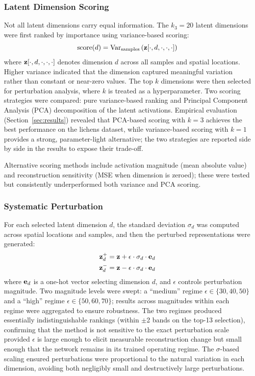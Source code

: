 \subsubsection{Latent Dimension Scoring}
Not all latent dimensions carry equal information.
The $k_3 = 20$ latent dimensions were first ranked by importance using variance-based scoring:
\begin{equation}
\text{score}(d) = \text{Var}_{\text{samples}}\left(\mathbf{z}[\cdot, d, \cdot, \cdot, \cdot]\right)
\label{eq:dim_score}
\end{equation}
where $\mathbf{z}[\cdot, d, \cdot, \cdot, \cdot]$ denotes dimension $d$ across all samples and spatial locations.
Higher variance indicated that the dimension captured meaningful variation rather than constant or near-zero values.
The top $k$ dimensions were then selected for perturbation analysis, where $k$ is treated as a hyperparameter.
Two scoring strategies were compared: pure variance-based ranking and Principal Component Analysis (PCA) decomposition of the latent activations.
Empirical evaluation (Section~\ref{sec:results}) revealed that PCA-based scoring with $k=3$ achieves the best performance on the lichens dataset, while variance-based scoring with $k=1$ provides a strong, parameter-light alternative; the two strategies are reported side by side in the results to expose their trade-off.

Alternative scoring methods include activation magnitude (mean absolute value) and reconstruction sensitivity (MSE when dimension is zeroed); these were tested but consistently underperformed both variance and PCA scoring.

\subsubsection{Systematic Perturbation}
For each selected latent dimension $d$, the standard deviation $\sigma_d$ was computed across spatial locations and samples, and then the perturbed representations were generated:
\begin{align}
\mathbf{z}^{+}_d &= \mathbf{z} + \epsilon \cdot \sigma_d \cdot \mathbf{e}_d \label{eq:perturb_pos}\\
\mathbf{z}^{-}_d &= \mathbf{z} - \epsilon \cdot \sigma_d \cdot \mathbf{e}_d \label{eq:perturb_neg}
\end{align}
where $\mathbf{e}_d$ is a one-hot vector selecting dimension $d$, and $\epsilon$ controls perturbation magnitude.
Two magnitude levels were swept: a ``medium'' regime $\epsilon \in \{30, 40, 50\}$ and a ``high'' regime $\epsilon \in \{50, 60, 70\}$; results across magnitudes within each regime were aggregated to ensure robustness.
The two regimes produced essentially indistinguishable rankings (within $\pm$2 bands on the top-13 selection), confirming that the method is not sensitive to the exact perturbation scale provided $\epsilon$ is large enough to elicit measurable reconstruction change but small enough that the network remains in its trained operating regime.
The $\sigma$-based scaling ensured perturbations were proportional to the natural variation in each dimension, avoiding both negligibly small and destructively large perturbations.

